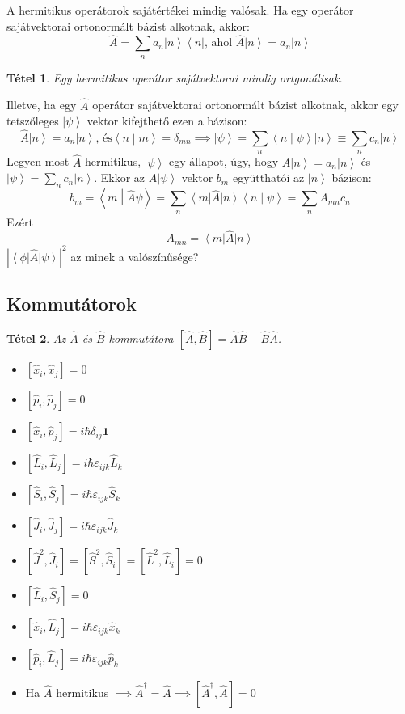 \documentclass[12pt]{article}
\theoremstyle{plain}
\newcommand{\ket}[1]{\left| #1 \right >}
\newcommand{\bra}[1]{\left < #1 \right |}
\newcommand{\bracket}[2]{\left < #1 \middle | #2 \right>}
\newcommand{\commut}[2]{\left [ #1 , #2 \right]}
\newtheorem*{theorem*}{Tétel}
\begin{document}
A hermitikus operátorok sajátértékei mindig valósak. Ha egy operátor sajátvektorai ortonormált bázist alkotnak, akkor:
$$ \hat A = \sum\limits_{n} a_n \ket n \bra n \textrm{, ahol } \hat A \ket n = a_n \ket n $$
\begin{theorem*}
    Egy hermitikus operátor sajátvektorai mindig ortgonálisak.
\end{theorem*}
Illetve, ha egy $\hat A$ operátor sajátvektorai ortonormált bázist alkotnak, akkor egy tetszőleges $\ket \psi$ vektor
kifejthető ezen a bázison:
$$\hat A \ket n = a_n \ket n \textrm{, és} \bracket{n}{m} = \delta_{mn} \implies \ket\psi = \sum\limits_n \bracket{n}{\psi} \ket n 
\equiv  \sum\limits_n c_n \ket n$$ 
Legyen most $\hat A$ hermitikus, $\ket\psi$ egy állapot, úgy, hogy $\hat A \ket n = a_n\ket n$ és $\ket\psi = \sum\limits_n c_n \ket n$.
Ekkor az $\hat A \ket\psi$ vektor $b_m$ együtthatói az $\ket n$ bázison:
$$b_m = \bracket{m}{\hat A \psi} = \sum\limits_n \bra{m} \hat A \ket n \bracket{n}{\psi} = \sum\limits_n A_{mn}c_n$$
Ezért $$ A_{mn} = \bra m \hat A \ket n$$
$|\bra \phi \hat A \ket \psi|^2$ az minek a valószínűsége?

\subsection{Kommutátorok}
\begin{theorem*}
    Az $\hat A$ és $\hat B$ kommutátora $\commut{\hat A}{\hat B} = \hat A \hat B - \hat B \hat A$. 
\end{theorem*}
\begin{itemize}
    \item $\commut{\hat x_i}{\hat x_j} = 0$
    \item $\commut{\hat p_i}{\hat p_j} = 0$
    \item $\commut{\hat x_i}{\hat p_j} = i\hbar \delta_{ij}\mathbf 1$
    \item $\commut{\hat L_i}{\hat L_j} = i \hbar \varepsilon_{ijk}\hat L_k$
    \item $\commut{\hat S_i}{\hat S_j} = i \hbar \varepsilon_{ijk}\hat S_k$
    \item $\commut{\hat J_i}{\hat J_j} = i \hbar \varepsilon_{ijk}\hat J_k$
    \item $\commut{\hat J^2}{\hat J_i} = \commut{\hat S^2}{\hat S_i} = \commut{\hat L^2}{\hat L_i} = 0$
    \item $\commut{\hat L_i}{\hat S_j} = 0$
    \item $\commut{\hat x_i}{\hat L_j} = i \hbar \varepsilon_{ijk}\hat x_k$
    \item $\commut{\hat p_i}{\hat L_j} = i \hbar \varepsilon_{ijk}\hat p_k$    
    \item Ha $\hat A$ hermitikus $\implies \hat A^\dag = \hat A \implies \commut{\hat A^\dag}{\hat A} = 0$  
    
    
\end{itemize}
\end{document}

